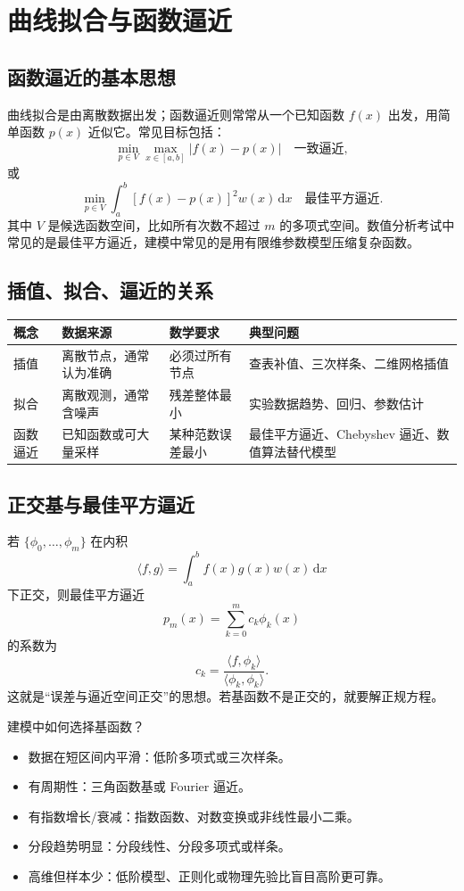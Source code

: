 \documentclass[11pt,a4paper]{ctexart}
\newcommand{\diff}{\mathrm{d}}
\begin{document}
\newpage
\section{曲线拟合与函数逼近}

\subsection{函数逼近的基本思想}

曲线拟合是由离散数据出发；函数逼近则常常从一个已知函数 $f(x)$ 出发，用简单函数 $p(x)$ 近似它。常见目标包括：
\[
  \min_{p\in V}\max_{x\in[a,b]}|f(x)-p(x)| \quad \text{一致逼近},
\]
或
\[
  \min_{p\in V}\int_a^b [f(x)-p(x)]^2 w(x)\,\diff x \quad \text{最佳平方逼近}.
\]
其中 $V$ 是候选函数空间，比如所有次数不超过 $m$ 的多项式空间。数值分析考试中常见的是最佳平方逼近，建模中常见的是用有限维参数模型压缩复杂函数。

\subsection{插值、拟合、逼近的关系}

\begin{longtable}{p{3.2cm}p{4.1cm}p{4.1cm}p{3.6cm}}
\toprule
概念 & 数据来源 & 数学要求 & 典型问题 \\
\midrule
插值 & 离散节点，通常认为准确 & 必须过所有节点 & 查表补值、三次样条、二维网格插值 \\
拟合 & 离散观测，通常含噪声 & 残差整体最小 & 实验数据趋势、回归、参数估计 \\
函数逼近 & 已知函数或可大量采样 & 某种范数误差最小 & 最佳平方逼近、Chebyshev 逼近、数值算法替代模型 \\
\bottomrule
\end{longtable}

\subsection{正交基与最佳平方逼近}

若 $\{\phi_0,\ldots,\phi_m\}$ 在内积
\[
  \langle f,g\rangle=\int_a^b f(x)g(x)w(x)\,\diff x
\]
下正交，则最佳平方逼近
\[
  p_m(x)=\sum_{k=0}^{m}c_k\phi_k(x)
\]
的系数为
\[
  c_k=\frac{\langle f,\phi_k\rangle}{\langle\phi_k,\phi_k\rangle}.
\]
这就是“误差与逼近空间正交”的思想。若基函数不是正交的，就要解正规方程。

\begin{keybox}{建模中如何选择基函数？}
\begin{itemize}
  \item 数据在短区间内平滑：低阶多项式或三次样条。
  \item 有周期性：三角函数基或 Fourier 逼近。
  \item 有指数增长/衰减：指数函数、对数变换或非线性最小二乘。
  \item 分段趋势明显：分段线性、分段多项式或样条。
  \item 高维但样本少：低阶模型、正则化或物理先验比盲目高阶更可靠。
\end{itemize}
\end{keybox}
\end{document}
